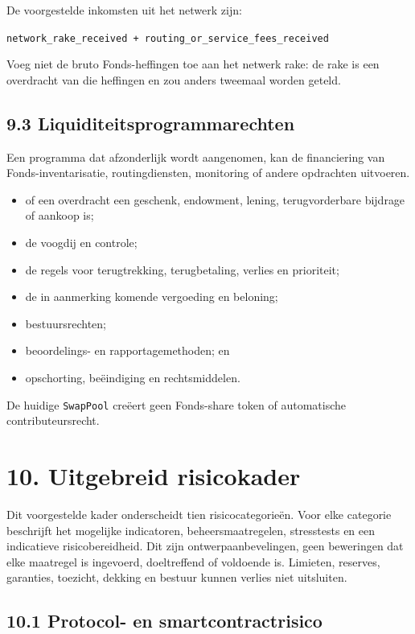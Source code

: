 \documentclass[11pt]{article}
\begin{document}
De voorgestelde inkomsten uit het netwerk zijn:

\texttt{network\_rake\_received + routing\_or\_service\_fees\_received}

Voeg niet de bruto Fonds-heffingen toe aan het netwerk rake: de rake is een overdracht van die heffingen en zou anders tweemaal worden geteld.

\subsection*{9.3 Liquiditeitsprogrammarechten}

Een programma dat afzonderlijk wordt aangenomen, kan de financiering van Fonds-inventarisatie, routingdiensten, monitoring of andere opdrachten uitvoeren.

\begin{itemize}[leftmargin=*]
\item of een overdracht een geschenk, endowment, lening, terugvorderbare bijdrage of aankoop is;
\item de voogdij en controle;
\item de regels voor terugtrekking, terugbetaling, verlies en prioriteit;
\item de in aanmerking komende vergoeding en beloning;
\item bestuursrechten;
\item beoordelings- en rapportagemethoden; en
\item opschorting, beëindiging en rechtsmiddelen.
\end{itemize}
De huidige \texttt{SwapPool} creëert geen Fonds-share token of automatische contributeursrecht.


\section*{10. Uitgebreid risicokader}

Dit voorgestelde kader onderscheidt tien risicocategorieën. Voor elke categorie beschrijft het mogelijke indicatoren, beheersmaatregelen, stresstests en een indicatieve risicobereidheid. Dit zijn ontwerpaanbevelingen, geen beweringen dat elke maatregel is ingevoerd, doeltreffend of voldoende is. Limieten, reserves, garanties, toezicht, dekking en bestuur kunnen verlies niet uitsluiten.

\subsection*{10.1 Protocol- en smartcontractrisico}
\end{document}
